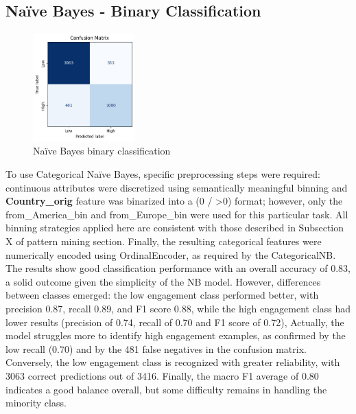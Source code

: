 \subsection{Naïve Bayes - Binary Classification}
\begin{figure}
    \centering
    \includegraphics[width=0.35\textwidth]{plots/nb_binary_confmatrix.png}
    \caption{Naïve Bayes binary classification}
    \label{fig:nb_binary}
\end{figure}
To use Categorical Naïve Bayes, specific preprocessing steps were required: continuous attributes were discretized using semantically meaningful binning and \textbf{Country\_orig} feature was binarized into a (0 / >0) format; 
however, only the from\_America\_bin  and from\_Europe\_bin were used for this particular task. 
All binning strategies applied here are consistent with those described in Subsection X of pattern mining section. 
Finally, the resulting categorical features were numerically encoded using OrdinalEncoder, as required by the CategoricalNB.\\
The results show good classification performance with an overall accuracy of 0.83, a solid outcome given the simplicity of the NB model.
However, differences between classes emerged: the low engagement class performed better, with precision 0.87, recall 0.89, and F1 score 0.88, while the high engagement class had lower results 
(precision of 0.74, recall of 0.70 and F1 score of 0.72), 
Actually, the model struggles more to identify high engagement examples, as confirmed by the low recall (0.70) and by the 481 false negatives in the confusion matrix. 
Conversely, the low engagement class is recognized with greater reliability, with 3063 correct predictions out of 3416.
Finally, the macro F1 average of 0.80 indicates a good balance overall, but some difficulty remains in handling the minority class.



